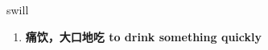 
\begin{frame}
{\huge swill}
\begin{center}
\begin{enumerate}\Large
  \item \textbf{痛饮，大口地吃 to drink something quickly}
\end{enumerate}
\end{center}
\end{frame}
